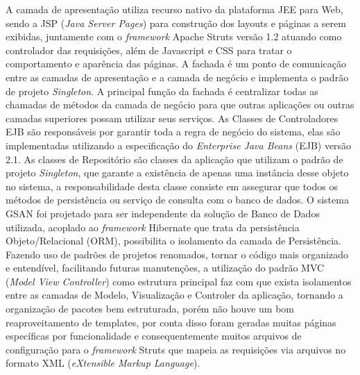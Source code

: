 	
A camada de apresentação utiliza recurso nativo da plataforma JEE para Web, sendo a JSP (\textit{Java Server Pages}) para construção dos layouts e páginas a serem exibidas, juntamente com o \textit{framework} Apache Struts versão 1.2 atuando como controlador das requisições, além de Javascript e CSS para tratar o comportamento e aparência das páginas.
A fachada é um ponto de comunicação entre as camadas de apresentação e a camada de negócio e implementa o padrão de projeto \textit{Singleton}. A principal função da fachada é centralizar todas as chamadas de métodos da camada de negócio para que outras aplicações ou outras camadas superiores possam utilizar seus serviços.
As Classes de Controladores EJB são responsáveis por garantir toda a regra de negócio do sistema, elas são implementadas utilizando a especificação do \textit{Enterprise Java Beans} (EJB) versão 2.1.
As classes de Repositório são classes da aplicação que utilizam o padrão de projeto \textit{Singleton}, que garante a existência de apenas uma instância desse objeto no sistema, a responsabilidade desta classe consiste em assegurar que todos os métodos de persistência ou serviço de consulta com o banco de dados.
O sistema GSAN foi projetado para ser independente da solução de Banco de Dados utilizada, acoplado ao \textit{framework} Hibernate que trata da persistência Objeto/Relacional (ORM), possibilita o isolamento da camada de Persistência. Fazendo uso de padrões de projetos renomados, tornar o código mais organizado e entendível, facilitando futuras manutenções, a utilização do padrão MVC (\textit{Model View Controller}) como estrutura principal faz com que exista isolamentos entre as camadas de Modelo, Visualização e Controler da aplicação, tornando a organização de pacotes bem estruturada, porém  não houve um bom reaproveitamento de templates, por conta disso foram geradas muitas páginas específicas por funcionalidade e consequentemente muitos arquivos de configuração para o \textit{framework} Struts  que mapeia as requisições via arquivos no formato XML (\textit{eXtensible Markup Language}).
	
	

